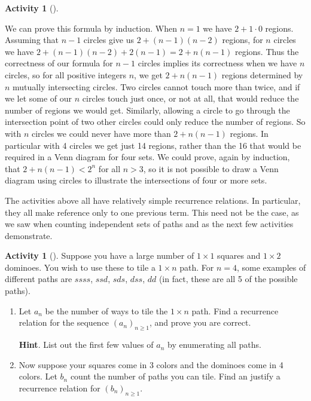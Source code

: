 \documentclass[10pt,]{book}
\theoremstyle{plain}
\theoremstyle{definition}
\theoremstyle{definition}
\theoremstyle{definition}
\newtheorem{activity}[project]{Activity}
\numberwithin{equation}{chapter}
\newcommand{\lt}{<}
\begin{document}
\begin{activity}[]
\begin{equation*}
\end{equation*}
%
\par
\hypertarget{p-907}{}%
We can prove this formula by induction. When \(n=1\) we have \(2+1\cdot0\) regions. Assuming that \(n-1\) circles give us \(2+(n-1)(n-2)\) regions, for \(n\) circles we have \(2+(n-1)(n-2) +2(n-1)=2+n(n-1)\) regions. Thus the correctness of our formula for \(n-1\) circles implies its correctness when we have \(n\) circles, so for all positive integers \(n\), we get \(2+n(n-1)\) regions determined by \(n\) mutually intersecting circles. Two circles cannot touch more than twice, and if we let some of our \(n\) circles touch just once, or not at all, that would reduce the number of regions we would get. Similarly, allowing a circle to go through the intersection point of two other circles could only reduce the number of regions. So with \(n\) circles we could never have more than \(2+n(n-1)\) regions. In particular with 4 circles we get just 14 regions, rather than the 16 that would be required in a Venn diagram for four sets. We could prove, again by induction, that \(2+n(n-1)\lt 2^n\) for all \(n>3\), so it is not possible to draw a Venn diagram using circles to illustrate the intersections of four or more sets.%
\end{activity}
\hypertarget{p-908}{}%
The activities above all have relatively simple recurrence relations.  In particular, they all make reference only to one previous term.  This need not be the case, as we saw when counting independent sets of paths and as the next few activities demonstrate.%
\begin{activity}[]\label{act-dominoes}
\hypertarget{p-909}{}%
Suppose you have a large number of \(1\times 1\) squares and \(1 \times 2\) dominoes.  You wish to use these to tile a \(1 \times n\) path.  For \(n = 4\), some examples of different paths are \(ssss\), \(ssd\), \(sds\), \(dss\), \(dd\) (in fact, these are all 5 of the possible paths).%
\begin{enumerate}[font=\bfseries,label=(\alph*),ref=\alph*]
\item\label{task-171} \hypertarget{p-910}{}%
Let \(a_n\) be the number of ways to tile the \(1 \times n\) path.  Find a recurrence relation for the sequence \((a_n)_{n \ge 1}\), and prove you are correct.%
\par\smallskip%
\noindent\textbf{Hint}.\hypertarget{hint-98}{}\quad%
\hypertarget{p-911}{}%
List out the first few values of \(a_n\) by enumerating all paths.%
\item\label{task-172} \hypertarget{p-912}{}%
Now suppose your squares come in 3 colors and the dominoes come in 4 colors.  Let \(b_n\) count the number of paths you can tile.  Find an justify a recurrence relation for \((b_n)_{n \ge 1}\).%
\end{enumerate}
\end{activity}
\end{document}
